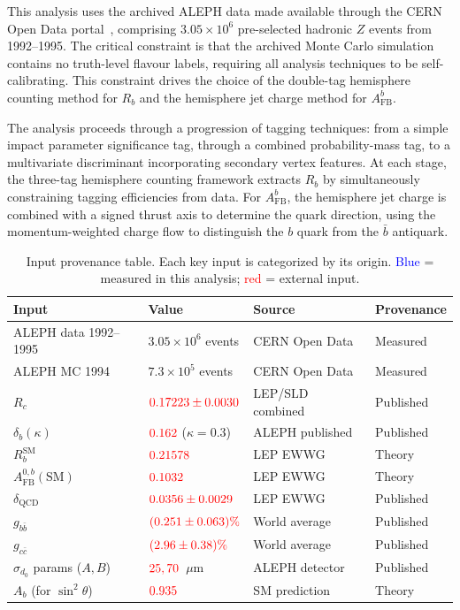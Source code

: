 \documentclass[11pt,a4paper]{article}
\newcommand{\measured}[1]{\textcolor{blue}{#1}}
\newcommand{\external}[1]{\textcolor{red}{#1}}
\begin{document}
This analysis uses the archived ALEPH data made available through the
CERN Open Data portal~\cite{ALEPH:opendata}, comprising $3.05 \times 10^6$
pre-selected hadronic $Z$ events from 1992--1995.  The critical constraint
is that the archived Monte Carlo simulation contains no truth-level flavour
labels, requiring all analysis techniques to be self-calibrating.  This
constraint drives the choice of the double-tag hemisphere counting method
for $R_b$ and the hemisphere jet charge method for $A_\mathrm{FB}^b$.

The analysis proceeds through a progression of tagging techniques: from
a simple impact parameter significance tag, through a combined
probability-mass tag, to a multivariate discriminant incorporating
secondary vertex features.  At each stage, the three-tag hemisphere
counting framework extracts $R_b$ by simultaneously constraining
tagging efficiencies from data.  For $A_\mathrm{FB}^b$, the
hemisphere jet charge is combined with a signed thrust axis to determine
the quark direction, using the momentum-weighted charge flow to
distinguish the $b$ quark from the $\bar{b}$ antiquark.

\begin{table}[htbp]
\centering
\caption{Input provenance table.  Each key input is categorized by its
  origin.  \measured{Blue} = measured in this analysis;
  \external{red} = external input.}
\label{tbl:provenance}
\begin{tabular}{llll}
\toprule
Input & Value & Source & Provenance \\
\midrule
ALEPH data 1992--1995 & $3.05 \times 10^6$ events & CERN Open Data~\cite{ALEPH:opendata} & Measured \\
ALEPH MC 1994 & $7.3 \times 10^5$ events & CERN Open Data~\cite{ALEPH:opendata} & Measured \\
$R_c$ & $\external{0.17223 \pm 0.0030}$ & LEP/SLD combined~\cite{LEP:EWWG:2005} & Published \\
$\delta_b(\kappa)$ & $\external{0.162}$ ($\kappa = 0.3$) & ALEPH published~\cite{LEP:EWWG:2005} & Published \\
$R_b^\mathrm{SM}$ & $\external{0.21578}$ & LEP EWWG~\cite{LEP:EWWG:2005} & Theory \\
$A_\mathrm{FB}^{0,b}(\mathrm{SM})$ & $\external{0.1032}$ & LEP EWWG~\cite{LEP:EWWG:2005} & Theory \\
$\delta_\mathrm{QCD}$ & $\external{0.0356 \pm 0.0029}$ & LEP EWWG~\cite{LEP:EWWG:2005} & Published \\
$g_{b\bar{b}}$ & $\external{(0.251 \pm 0.063)\%}$ & World average~\cite{ALEPH:gbb} & Published \\
$g_{c\bar{c}}$ & $\external{(2.96 \pm 0.38)\%}$ & World average~\cite{LEP:gcc} & Published \\
$\sigma_{d_0}$ params ($A, B$) & $\external{25, 70}$~$\mu$m & ALEPH detector~\cite{ALEPH:VDET} & Published \\
$A_b$ (for $\sin^2\theta$) & $\external{0.935}$ & SM prediction~\cite{LEP:EWWG:2005} & Theory \\
\bottomrule
\end{tabular}
\end{table}
\end{document}
